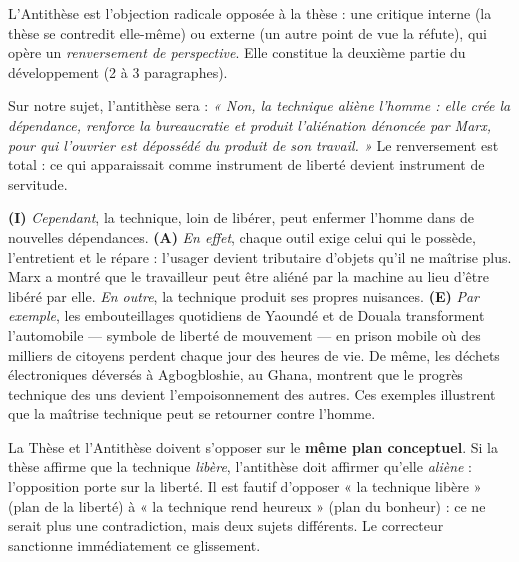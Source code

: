 \documentclass[11pt]{article}
\newcommand{\cle}[1]{{\popxbold\color{popdark}#1}}
\begin{document}
\begin{definition}[L'Antithèse]
L'\cle{Antithèse} est l'objection radicale opposée à la thèse : une critique interne (la thèse se contredit elle-même) ou externe (un autre point de vue la réfute), qui opère un \emph{renversement de perspective}. Elle constitue la deuxième partie du développement (2 à 3 paragraphes).
\end{definition}

Sur notre sujet, l'antithèse sera : \emph{« Non, la technique aliène l'homme : elle crée la dépendance, renforce la bureaucratie et produit l'aliénation dénoncée par Marx, pour qui l'ouvrier est dépossédé du produit de son travail. »} Le renversement est total : ce qui apparaissait comme instrument de liberté devient instrument de servitude.

\begin{exemplebox}
\textbf{(I)} \emph{Cependant}, la technique, loin de libérer, peut enfermer l'homme dans de nouvelles dépendances. \textbf{(A)} \emph{En effet}, chaque outil exige celui qui le possède, l'entretient et le répare : l'usager devient tributaire d'objets qu'il ne maîtrise plus. Marx a montré que le travailleur peut être aliéné par la machine au lieu d'être libéré par elle. \emph{En outre}, la technique produit ses propres nuisances. \textbf{(E)} \emph{Par exemple}, les embouteillages quotidiens de Yaoundé et de Douala transforment l'automobile — symbole de liberté de mouvement — en prison mobile où des milliers de citoyens perdent chaque jour des heures de vie. De même, les déchets électroniques déversés à Agbogbloshie, au Ghana, montrent que le progrès technique des uns devient l'empoisonnement des autres. Ces exemples illustrent que la maîtrise technique peut se retourner contre l'homme.
\end{exemplebox}

\begin{propriete}
La Thèse et l'Antithèse doivent s'opposer sur le \textbf{même plan conceptuel}. Si la thèse affirme que la technique \emph{libère}, l'antithèse doit affirmer qu'elle \emph{aliène} : l'opposition porte sur la liberté. Il est fautif d'opposer « la technique libère » (plan de la liberté) à « la technique rend heureux » (plan du bonheur) : ce ne serait plus une contradiction, mais deux sujets différents. Le correcteur sanctionne immédiatement ce glissement.
\end{propriete}
\end{document}
